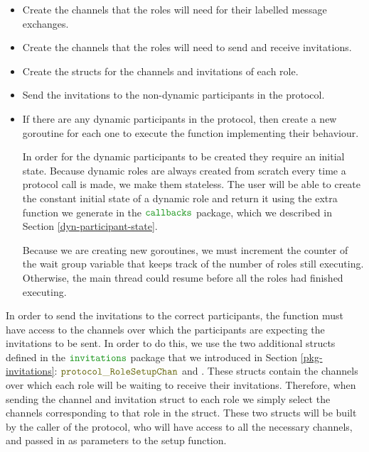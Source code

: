 \documentclass[12pt,twoside]{report}
\begin{document}
\begin{itemize}
    \item Create the channels that the roles will need for their labelled message exchanges.
    \item Create the channels that the roles will need to send and receive invitations.
    \item Create the structs for the channels and invitations of each role.
    \item Send the invitations to the non-dynamic participants in the protocol.
    \item If there are any dynamic participants in the protocol, then create a new goroutine for each one to execute the function implementing their behaviour.
    
    In order for the dynamic participants to be created they require an initial state. Because dynamic roles are always created from scratch every time a protocol call is made, we make them stateless. The user will be able to create the constant initial state of a dynamic role and return it using the extra function we generate in the $\pkgname{callbacks}$ package, which we described in Section \ref{dyn-participant-state}.

    Because we are creating new goroutines, we must increment the counter of the wait group variable that keeps track of the number of roles still executing. Otherwise, the main thread could resume before all the roles had finished executing.
\end{itemize}

In order to send the invitations to the correct participants, the function must have access to the channels over which the participants are expecting the invitations to be sent. In order to do this, we use the two additional structs defined in the $\pkgname{invitations}$ package that we introduced in Section \ref{pkg-invitations}: $\structname{protocol\_RoleSetupChan}$ and {\color{dkyellow} \texttt{}}. These structs contain the channels over which each role will be waiting to receive their invitations. Therefore, when sending the channel and invitation struct to each role we simply select the channels corresponding to that role in the struct. These two structs will be built by the caller of the protocol, who will have access to all the necessary channels, and passed in as parameters to the setup function.
\end{document}
